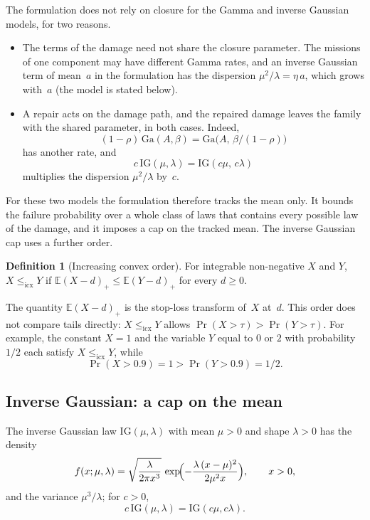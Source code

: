 \documentclass[11pt,a4paper]{article}
\theoremstyle{plain}
\theoremstyle{definition}
\newtheorem{definition}[theorem]{Definition}
\theoremstyle{remark}
\begin{document}
The formulation does not rely on closure for the Gamma and inverse Gaussian models, for two reasons.
\begin{itemize}
  \item The terms of the damage need not share the closure parameter.
    The missions of one component may have different Gamma rates, and an inverse Gaussian term of mean~$a$ in the formulation has the dispersion $\mu^2/\lambda = \eta\, a$, which grows with~$a$ (the model is stated below).
  \item A repair acts on the damage path, and the repaired damage leaves the family with the shared parameter, in both cases.
    Indeed,
    \begin{equation}
      (1-\rho)\,\mathrm{Ga}(A,\beta) = \mathrm{Ga}\bigl(A,\,\beta/(1-\rho)\bigr)
    \end{equation}
    has another rate, and
    \begin{equation}
      c\,\mathrm{IG}(\mu,\lambda) = \mathrm{IG}(c\mu,\,c\lambda)
    \end{equation}
    multiplies the dispersion $\mu^2/\lambda$ by~$c$.
\end{itemize}
For these two models the formulation therefore tracks the mean only.
It bounds the failure probability over a whole class of laws that contains every possible law of the damage, and it imposes a cap on the tracked mean.
The inverse Gaussian cap uses a further order.

\begin{definition}[Increasing convex order]\label{def:icx}
For integrable non-negative $X$ and $Y$, $X \le_{\mathrm{icx}} Y$ if $\mathbb{E}(X-d)_+ \le \mathbb{E}(Y-d)_+$ for every $d \ge 0$.
\end{definition}

The quantity $\mathbb{E}(X-d)_+$ is the stop-loss transform of~$X$ at~$d$.
This order does not compare tails directly: $X \le_{\mathrm{icx}} Y$ allows $\Pr(X > \tau) > \Pr(Y > \tau)$.
For example, the constant $X = 1$ and the variable $Y$ equal to $0$ or $2$ with probability $1/2$ each satisfy $X \le_{\mathrm{icx}} Y$, while
\begin{equation}
  \Pr(X > 0.9) = 1 > \Pr(Y > 0.9) = 1/2.
\end{equation}

\subsection{Inverse Gaussian: a cap on the mean}
The inverse Gaussian law $\mathrm{IG}(\mu, \lambda)$ with mean $\mu > 0$ and shape $\lambda > 0$ has the density
\begin{equation}
  f(x; \mu, \lambda) = \sqrt{\frac{\lambda}{2\pi x^3}}\,\exp\!\Bigl(-\frac{\lambda\,(x - \mu)^2}{2\mu^2 x}\Bigr), \qquad x > 0,
\end{equation}
and the variance $\mu^3/\lambda$; for $c > 0$,
\begin{equation}
  c\,\mathrm{IG}(\mu, \lambda) = \mathrm{IG}(c\mu, c\lambda).
\end{equation}
\end{document}
